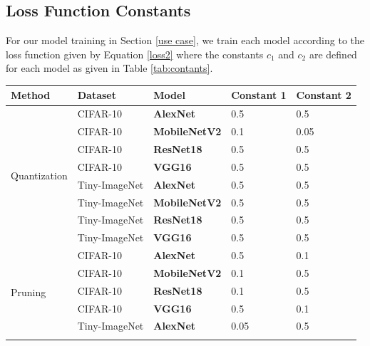 \documentclass{article}
\theoremstyle{plain}
\theoremstyle{definition}
\theoremstyle{remark}
\begin{document}
\pagebreak

\subsection{Loss Function Constants}\label{consts}
For our model training in Section \ref{use case}, we train each model according to the loss function given by Equation \ref{loss2} where the constants $c_1$ and $c_2$ are defined for each model as given in Table \ref{tab:contants}.

\begin{table}[h]
\centering
\begin{tabular}{|l|l|l|l|l|}
\hline
\textbf{Method}               & \textbf{Dataset} & \textbf{Model}   & \textbf{Constant 1} & \textbf{Constant 2} \\ \hline
\multirow{8}{*}{Quantization} & CIFAR-10          & \textbf{AlexNet} & 0.5                 & 0.5                 \\ \cline{2-5} 
                          & CIFAR-10       & \textbf{MobileNetV2} & 0.1  & 0.05 \\ \cline{2-5} 
                          & CIFAR-10       & \textbf{ResNet18}    & 0.5  & 0.5  \\ \cline{2-5} 
                          & CIFAR-10       & \textbf{VGG16}       & 0.5  & 0.5  \\ \cline{2-5} 
                          & Tiny-ImageNet & \textbf{AlexNet}     & 0.5  & 0.5  \\ \cline{2-5} 
                          & Tiny-ImageNet & \textbf{MobileNetV2} & 0.5  & 0.5  \\ \cline{2-5} 
                          & Tiny-ImageNet & \textbf{ResNet18}    & 0.5  & 0.5  \\ \cline{2-5} 
                          & Tiny-ImageNet & \textbf{VGG16}       & 0.5  & 0.5  \\ \hline
\multirow{9}{*}{Pruning}  & CIFAR-10       & \textbf{AlexNet}     & 0.5  & 0.1  \\ \cline{2-5} 
                          & CIFAR-10       & \textbf{MobileNetV2} & 0.1  & 0.5  \\ \cline{2-5} 
                          & CIFAR-10       & \textbf{ResNet18}    & 0.1  & 0.5  \\ \cline{2-5} 
                          & CIFAR-10       & \textbf{VGG16}       & 0.5  & 0.1  \\ \cline{2-5} 
                          & Tiny-ImageNet & \textbf{AlexNet}     & 0.05 & 0.5  \\ \cline{2-5} 

\end{tabular}
\end{table}
\end{document}
